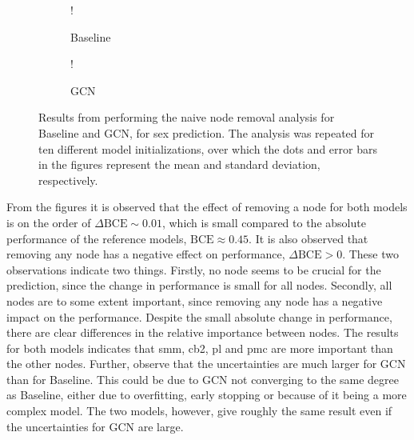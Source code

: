 \begin{figure}[!htbp]
    \centering
        \begin{subfigure}{.5\textwidth}
            \centering
            \begin{center}
                \resizebox {1.0\linewidth} {!} {
                    
                }
            \end{center}
            \caption{Baseline}
            \label{fig:naive_sex_baseline}
        \end{subfigure}%
        \begin{subfigure}{.5\textwidth}
            \centering
            \begin{center}
                \resizebox {1.0\linewidth} {!} {
                    
                }
            \end{center}
            \caption{GCN}
            \label{fig:naive_sex_gcn}
        \end{subfigure}
    \caption{Results from performing the naive node removal analysis for Baseline and GCN, for sex prediction. The analysis was repeated for ten different model initializations, over which the dots and error bars in the figures represent the mean and standard deviation, respectively.}
    \label{fig:naive_sex}
\end{figure}

From the figures it is observed that the effect of removing a node for both models is on the order of $\Delta \text{BCE} \sim 0.01$, which is small compared to the absolute performance of the reference models, $\text{BCE} \approx 0.45$. It is also observed that removing any node has a negative effect on performance, $\Delta\text{BCE}>0$. These two observations indicate two things. Firstly, no node seems to be crucial for the prediction, since the change in performance is small for all nodes. Secondly, all nodes are to some extent important, since removing any node has a negative impact on the performance. Despite the small absolute change in performance, there are clear differences in the relative importance between nodes. The results for both models indicates that \acrshort{smm}, \acrshort{cb2}, \acrshort{pl} and \acrshort{pmc} are more important than the other nodes. Further, observe that the uncertainties are much larger for GCN than for Baseline. This could be due to GCN not converging to the same degree as Baseline, either due to overfitting, early stopping or because of it being a more complex model. The two models, however, give roughly the same result even if the uncertainties for GCN are large. 


